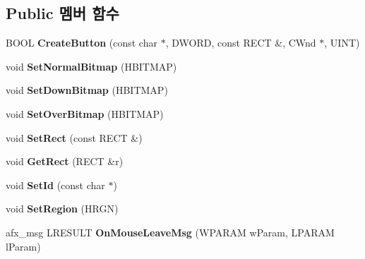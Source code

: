\subsection*{Public 멤버 함수}
\begin{DoxyCompactItemize}
\item 
\mbox{\label{class_skin_button_ad70dc6ed236a2274028c32744e3690bb}} 
B\+O\+OL {\bfseries Create\+Button} (const char $\ast$, D\+W\+O\+RD, const R\+E\+CT \&, C\+Wnd $\ast$, U\+I\+NT)
\item 
\mbox{\label{class_skin_button_a0546240e8395f52b721a5c95f03de902}} 
void {\bfseries Set\+Normal\+Bitmap} (H\+B\+I\+T\+M\+AP)
\item 
\mbox{\label{class_skin_button_a42845ac49a2d37651369d40a81656c4b}} 
void {\bfseries Set\+Down\+Bitmap} (H\+B\+I\+T\+M\+AP)
\item 
\mbox{\label{class_skin_button_aa2f72f089e76e7611f5498deab412d80}} 
void {\bfseries Set\+Over\+Bitmap} (H\+B\+I\+T\+M\+AP)
\item 
\mbox{\label{class_skin_button_ad260dbe4c70216d2c3d1f8df018c05a7}} 
void {\bfseries Set\+Rect} (const R\+E\+CT \&)
\item 
\mbox{\label{class_skin_button_aef7f1ced23d060545eabd5b57175143a}} 
void {\bfseries Get\+Rect} (R\+E\+CT \&r)
\item 
\mbox{\label{class_skin_button_ae710ecb793cf09d625d842bb863aa1da}} 
void {\bfseries Set\+Id} (const char $\ast$)
\item 
\mbox{\label{class_skin_button_abe8db625fad410a12db9eb1a281ba214}} 
void {\bfseries Set\+Region} (H\+R\+GN)
\item 
\mbox{\label{class_skin_button_a9ceb207ee0e34032dd2bc12c3da24e15}} 
afx\+\_\+msg L\+R\+E\+S\+U\+LT {\bfseries On\+Mouse\+Leave\+Msg} (W\+P\+A\+R\+AM w\+Param, L\+P\+A\+R\+AM l\+Param)
\item 
\mbox{\label{class_skin_button_ad4654dfa88cab2918e1fcd58223cdd5a}} 

\end{DoxyCompactItemize}
